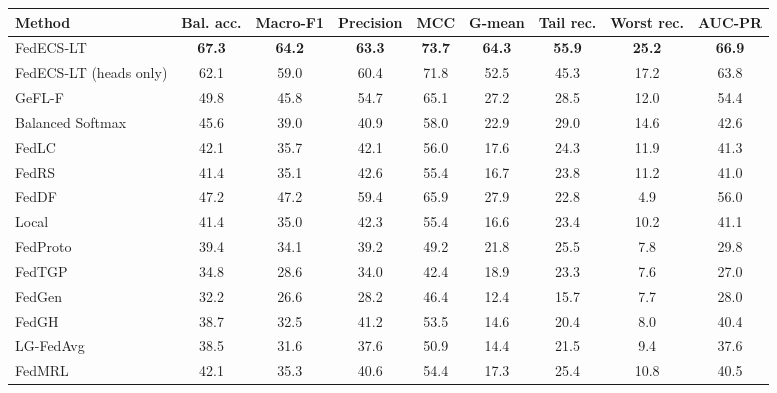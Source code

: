 \begin{tabular}{lcccccccc}
\toprule
Method & Bal. acc. & Macro-F1 & Precision & MCC & G-mean & Tail rec. & Worst rec. & AUC-PR\\
\midrule
FedECS-LT & \textbf{67.3} & \textbf{64.2} & \textbf{63.3} & \textbf{73.7} & \textbf{64.3} & \textbf{55.9} & \textbf{25.2} & \textbf{66.9}\\
FedECS-LT (heads only) & 62.1 & 59.0 & 60.4 & 71.8 & 52.5 & 45.3 & 17.2 & 63.8\\
GeFL-F & 49.8 & 45.8 & 54.7 & 65.1 & 27.2 & 28.5 & 12.0 & 54.4\\
Balanced Softmax & 45.6 & 39.0 & 40.9 & 58.0 & 22.9 & 29.0 & 14.6 & 42.6\\
FedLC & 42.1 & 35.7 & 42.1 & 56.0 & 17.6 & 24.3 & 11.9 & 41.3\\
FedRS & 41.4 & 35.1 & 42.6 & 55.4 & 16.7 & 23.8 & 11.2 & 41.0\\
FedDF & 47.2 & 47.2 & 59.4 & 65.9 & 27.9 & 22.8 & 4.9 & 56.0\\
Local & 41.4 & 35.0 & 42.3 & 55.4 & 16.6 & 23.4 & 10.2 & 41.1\\
FedProto & 39.4 & 34.1 & 39.2 & 49.2 & 21.8 & 25.5 & 7.8 & 29.8\\
FedTGP & 34.8 & 28.6 & 34.0 & 42.4 & 18.9 & 23.3 & 7.6 & 27.0\\
FedGen & 32.2 & 26.6 & 28.2 & 46.4 & 12.4 & 15.7 & 7.7 & 28.0\\
FedGH & 38.7 & 32.5 & 41.2 & 53.5 & 14.6 & 20.4 & 8.0 & 40.4\\
LG-FedAvg & 38.5 & 31.6 & 37.6 & 50.9 & 14.4 & 21.5 & 9.4 & 37.6\\
FedMRL & 42.1 & 35.3 & 40.6 & 54.4 & 17.3 & 25.4 & 10.8 & 40.5\\
\bottomrule
\end{tabular}
